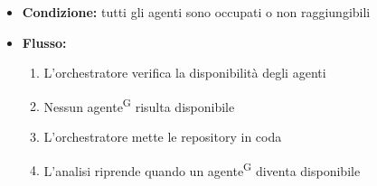 \documentclass[a4paper, 11pt]{article}
\begin{document}
\begin{itemize}
\begin{itemize}
\begin{itemize}
				\item \textbf{Condizione:} tutti gli agenti sono occupati o non raggiungibili
				\item \textbf{Flusso:} 
				\begin{enumerate}
					\item L'orchestratore verifica la disponibilità degli agenti
					\item Nessun agente\textsuperscript{G} risulta disponibile
					\item L'orchestratore mette le repository in coda
					\item L'analisi riprende quando un agente\textsuperscript{G} diventa disponibile
				\end{enumerate}
			\end{itemize}
	\end{itemize}
\end{itemize}
\end{document}
